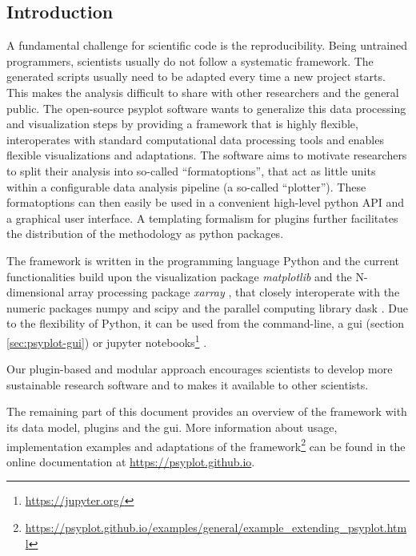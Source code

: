 \documentclass[
11pt, %
english, %
singlespacing, %
headsepline, %
]{article} %
\begin{document}
\begin{refsection}


\section{Introduction}  \label{sec:psyplot-review}

A fundamental challenge for scientific code is the reproducibility. Being untrained programmers, scientists usually do not follow a systematic framework. The generated scripts usually need to be adapted every time a new project starts. This makes the analysis difficult to share with other researchers and the general public. The open-source psyplot software wants to generalize this data processing and visualization steps by providing a framework that is highly flexible, interoperates with standard computational data processing tools and enables flexible visualizations and adaptations. The software aims to motivate researchers to split their analysis into so-called “formatoptions”, that act as little units within a configurable data analysis pipeline (a so-called “plotter”). These formatoptions can then easily be used in a convenient high-level python API and a graphical user interface. A templating formalism for plugins further facilitates the distribution of the methodology as python packages.

The framework is written in the programming language Python \citep{PerezGrangerHunter2011} and the current functionalities build upon the visualization package \textit{matplotlib} \citep{Hunter2007} and the N-dimensional array processing package \textit{xarray} \citep{HoyerHamman2017}, that closely interoperate with the numeric packages numpy and scipy \citep{JonesOliphantPetersonEtAl2001, Oliphant2006} and the parallel computing library dask \citep{DDT2016}. Due to the flexibility of Python, it can be used from the command-line, a \gls{gui} (section \ref{sec:psyplot-gui}) or jupyter notebooks\footnote{\url{https://jupyter.org/}} \citep{KluyverRaganKelleyPerezEtAl2016}.

Our plugin-based and modular approach encourages scientists to develop more sustainable research software and to makes it available to other scientists.

The remaining part of this document provides an overview of the framework with its data model, plugins and the \gls{gui}. More information about usage, implementation examples and adaptations of the framework\footnote{\url{https://psyplot.github.io/examples/general/example_extending_psyplot.html}} can be found in the online documentation at \url{https://psyplot.github.io}.


\end{refsection}
\end{document}
